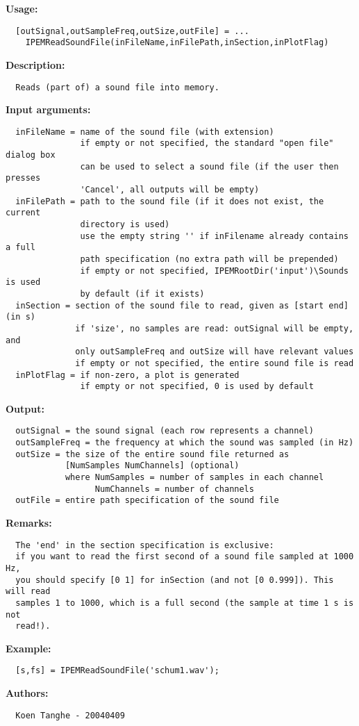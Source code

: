 \textbf{Usage:}
\begin{verbatim}  [outSignal,outSampleFreq,outSize,outFile] = ...
    IPEMReadSoundFile(inFileName,inFilePath,inSection,inPlotFlag)

\end{verbatim}
\textbf{Description:}
\begin{verbatim}  Reads (part of) a sound file into memory.

\end{verbatim}
\textbf{Input arguments:}
\begin{verbatim}  inFileName = name of the sound file (with extension)
               if empty or not specified, the standard "open file" dialog box
               can be used to select a sound file (if the user then presses
               'Cancel', all outputs will be empty)
  inFilePath = path to the sound file (if it does not exist, the current
               directory is used)
               use the empty string '' if inFilename already contains a full 
               path specification (no extra path will be prepended)
               if empty or not specified, IPEMRootDir('input')\Sounds is used
               by default (if it exists)
  inSection = section of the sound file to read, given as [start end] (in s)
              if 'size', no samples are read: outSignal will be empty, and
              only outSampleFreq and outSize will have relevant values
              if empty or not specified, the entire sound file is read
  inPlotFlag = if non-zero, a plot is generated
               if empty or not specified, 0 is used by default

\end{verbatim}
\textbf{Output:}
\begin{verbatim}  outSignal = the sound signal (each row represents a channel)
  outSampleFreq = the frequency at which the sound was sampled (in Hz)
  outSize = the size of the entire sound file returned as
            [NumSamples NumChannels] (optional)
            where NumSamples = number of samples in each channel
                  NumChannels = number of channels
  outFile = entire path specification of the sound file

\end{verbatim}
\textbf{Remarks:}
\begin{verbatim}  The 'end' in the section specification is exclusive:
  if you want to read the first second of a sound file sampled at 1000 Hz,
  you should specify [0 1] for inSection (and not [0 0.999]). This will read
  samples 1 to 1000, which is a full second (the sample at time 1 s is not
  read!).

\end{verbatim}
\textbf{Example:}
\begin{verbatim}  [s,fs] = IPEMReadSoundFile('schum1.wav');

\end{verbatim}
\textbf{Authors:}
\begin{verbatim}  Koen Tanghe - 20040409
\end{verbatim}


